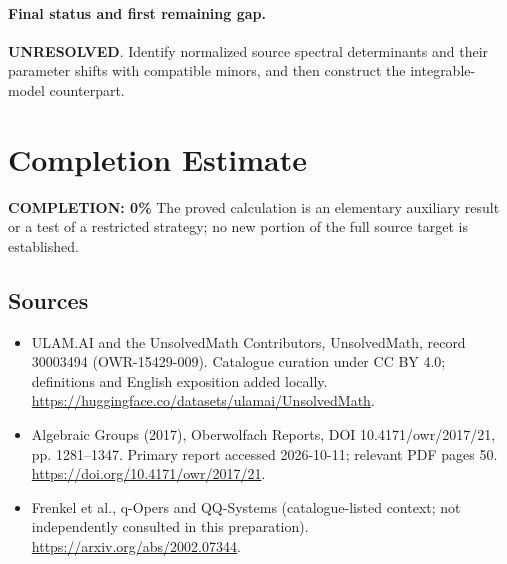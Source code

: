 \documentclass[11pt]{article}
\begin{document}
\paragraph{Final status and first remaining gap.}
\textbf{UNRESOLVED}. Identify normalized source spectral determinants and their parameter shifts with compatible minors, and then construct the integrable-model counterpart.

\section{Completion Estimate}
\noindent\textbf{COMPLETION: 0\%}
The proved calculation is an elementary auxiliary result or a test of a restricted strategy; no new portion of the full source target is established.

\subsection{Sources}
\begin{itemize}
\item[\hypertarget{source:30003494:1}{S1}] ULAM.AI and the UnsolvedMath Contributors, UnsolvedMath, record 30003494 (OWR-15429-009). Catalogue curation under CC BY 4.0; definitions and English exposition added locally.
\url{https://huggingface.co/datasets/ulamai/UnsolvedMath}.
\item[\hypertarget{source:30003494:2}{S2}] Algebraic Groups (2017), Oberwolfach Reports, DOI 10.4171/owr/2017/21, pp. 1281--1347. Primary report accessed 2026-10-11; relevant PDF pages 50.
\url{https://doi.org/10.4171/owr/2017/21}.
\item[\hypertarget{source:30003494:3}{S3}] Frenkel et al., q-Opers and QQ-Systems (catalogue-listed context; not independently consulted in this preparation).
\url{https://arxiv.org/abs/2002.07344}.
\end{itemize}
\label{end:30003494}
\end{document}
